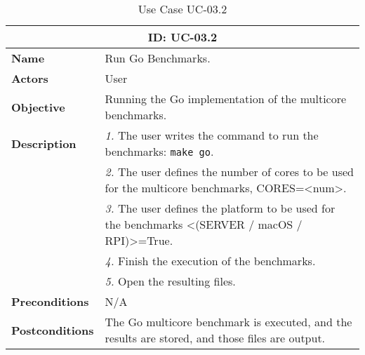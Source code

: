 \begin{table}[H]
    \centering
    \begin{tabular}{l p{10cm}}
        \toprule
        \multicolumn{2}{c}{\textbf{ID: UC-03.2}} \\
        \toprule
        \textbf{Name}                         &  Run Go Benchmarks. \\
        \textbf{Actors}                       &  User \\
        \textbf{Objective}                    &  Running the Go implementation of the multicore benchmarks. \\
        \multirow{1}{*}{\textbf{Description}} & \textsl{1.} The user writes the command to run the benchmarks: \texttt{make go}.\\
                                              & \textsl{2.} The user defines the number of cores to be used for the multicore benchmarks, CORES=<num>.\\
                                              & \textsl{3.} The user defines the platform to be used for the benchmarks <(SERVER / macOS / RPI)>=True.\\
                                              & \textsl{4.} Finish the execution of the benchmarks.\\
                                              & \textsl{5.} Open the resulting files.\\
        \textbf{Preconditions}                &  N/A \\
        \textbf{Postconditions}               &  The Go multicore benchmark is executed, and the results are stored, and those files are output. \\
    \end{tabular}
    \caption{Use Case UC-03.2}
    \label{tab:uc-03.2}
\end{table}


